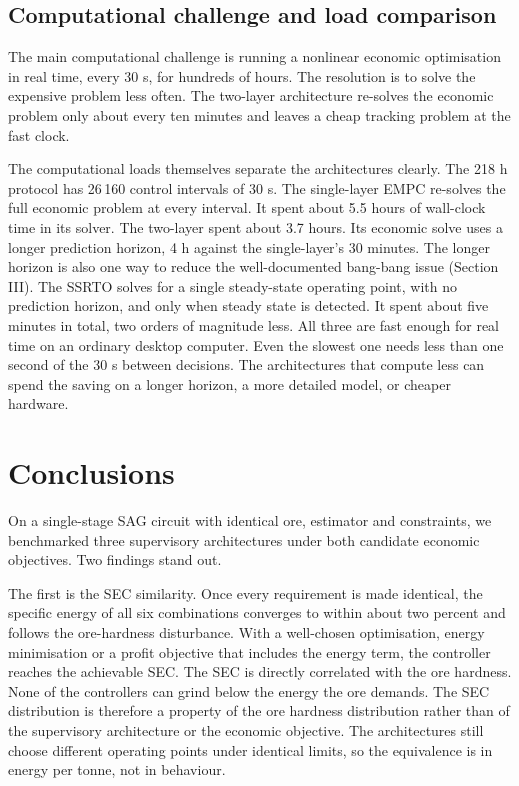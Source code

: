\documentclass[conference]{IEEEtran}
\begin{document}
\subsection{Computational challenge and load comparison}

The main computational challenge is running a nonlinear economic
optimisation in real time, every 30 s, for hundreds of hours. The
resolution is to solve the expensive problem less often. The two-layer
architecture re-solves the economic problem only about every ten
minutes and leaves a cheap tracking problem at the fast clock.

The computational loads themselves separate the architectures clearly.
The 218 h protocol has 26\,160 control intervals of 30 s. The
single-layer EMPC re-solves the full economic problem at every
interval. It spent about 5.5 hours of wall-clock time in its solver.
The two-layer spent about 3.7 hours. Its economic solve uses a longer
prediction horizon, 4 h against the
single-layer's 30 minutes. The longer horizon is also one way to
reduce the well-documented bang-bang issue
\cite{thivierge2023,ellis2017} (Section III). The SSRTO solves for a
single steady-state operating point, with no prediction horizon, and
only when steady state is detected. It
spent about five minutes in total, two orders of magnitude less. All three are fast enough for real time on
an ordinary desktop computer. Even the slowest one needs less than one
second of the 30 s between decisions. The architectures that compute
less can spend the saving on a longer horizon, a more detailed model,
or cheaper hardware.

\section{Conclusions}

On a single-stage SAG circuit with identical ore, estimator and
constraints, we benchmarked three supervisory architectures under both
candidate economic objectives. Two findings stand out.

The first is the SEC similarity. Once every requirement is made
identical, the specific energy of all six combinations converges to
within about two percent and follows the ore-hardness disturbance. With
a well-chosen optimisation, energy minimisation or a profit objective
that includes the energy term, the controller reaches the achievable
SEC. The SEC is directly correlated with the ore hardness.
None of the controllers can grind below the energy the ore demands. The
SEC distribution is therefore a property of the ore hardness
distribution rather than of the supervisory architecture or the
economic objective. The architectures still choose different
operating points under identical limits, so the equivalence is in energy
per tonne, not in behaviour.
\end{document}

